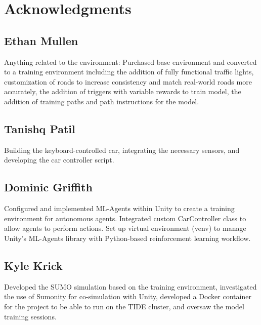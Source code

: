 \documentclass[conference]{IEEEtran}
\begin{document}
\section{Acknowledgments}
\subsection{Ethan Mullen}
Anything related to the environment: Purchased base environment and converted to a training environment including the addition of fully functional traffic lights, customization of roads to increase consistency and match real-world roads more accurately, the addition of triggers with variable rewards to train model, the addition of training paths and path instructions for the model.
\subsection{Tanishq Patil}
Building the keyboard-controlled car, integrating the necessary sensors, and developing the car controller script.
\subsection{Dominic Griffith} Configured and implemented ML-Agents within Unity to create a training environment for autonomous agents. Integrated custom CarController class to allow agents to perform actions. Set up virtual environment (venv) to manage Unity's ML-Agents library with Python-based reinforcement learning workflow.
\subsection{Kyle Krick}
Developed the SUMO simulation based on the training environment, investigated the use of Sumonity  for co-simulation with Unity, developed a Docker container for the project to be able to run on the TIDE cluster, and oversaw the model training sessions.




\end{document}
